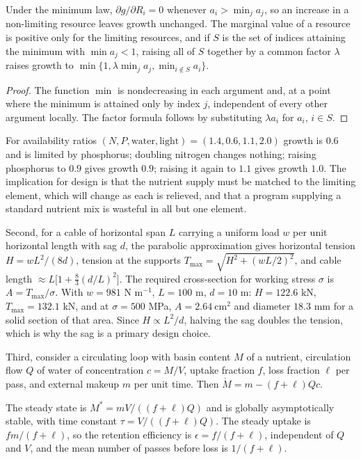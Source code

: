 \begin{proposition}
Under the minimum law, $\partial g/\partial R_i=0$ whenever $a_i>\min_{j}a_j$, so an increase in a non-limiting resource leaves growth unchanged. The marginal value of a resource is positive only for the limiting resources, and if $S$ is the set of indices attaining the minimum with $\min a_j<1$, raising all of $S$ together by a common factor $\lambda$ raises growth to $\min\{1,\lambda\min_ja_j,\min_{i\notin S}a_i\}$.
\end{proposition}

\begin{proof}
The function $\min$ is nondecreasing in each argument and, at a point where the minimum is attained only by index $j$, independent of every other argument locally. The factor formula follows by substituting $\lambda a_i$ for $a_i$, $i\in S$.
\end{proof}

For availability ratios $(N,P,\text{water},\text{light})=(1.4,0.6,1.1,2.0)$ growth is $0.6$ and is limited by phosphorus; doubling nitrogen changes nothing; raising phosphorus to $0.9$ gives growth $0.9$; raising it again to $1.1$ gives growth $1.0$. The implication for design is that the nutrient supply must be matched to the limiting element, which will change as each is relieved, and that a program supplying a standard nutrient mix is wasteful in all but one element.

Second, for a cable of horizontal span $L$ carrying a uniform load $w$ per unit horizontal length with sag $d$, the parabolic approximation gives horizontal tension $H=wL^2/(8d)$, tension at the supports $T_{\max}=\sqrt{H^2+(wL/2)^2}$, and cable length $\approx L\bigl[1+\tfrac83(d/L)^2\bigr]$. The required cross-section for working stress $\sigma$ is $A=T_{\max}/\sigma$. With $w=981$ N m$^{-1}$, $L=100$ m, $d=10$ m: $H=122.6$ kN, $T_{\max}=132.1$ kN, and at $\sigma=500$ MPa, $A=2.64\ \mathrm{cm^2}$ and diameter $18.3$ mm for a solid section of that area. Since $H\propto L^2/d$, halving the sag doubles the tension, which is why the sag is a primary design choice.

Third, consider a circulating loop with basin content $M$ of a nutrient, circulation flow $Q$ of water of concentration $c=M/V$, uptake fraction $f$, loss fraction $\ell$ per pass, and external makeup $m$ per unit time. Then $\dot M=m-(f+\ell)Qc$.

\begin{proposition}
The steady state is $M^\ast=mV/((f+\ell)Q)$ and is globally asymptotically stable, with time constant $\tau=V/((f+\ell)Q)$. The steady uptake is $fm/(f+\ell)$, so the retention efficiency is $\epsilon=f/(f+\ell)$, independent of $Q$ and $V$, and the mean number of passes before loss is $1/(f+\ell)$.
\end{proposition}

